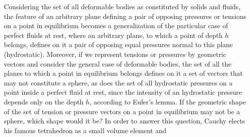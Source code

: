 Considering the set of all deformable bodies as constituted by solids and fluids, the feature of an arbitrary plane defining a pair of opposing pressures or tensions on a point in equilibrium becomes a generalization of the particular case of perfect fluids at rest, where an arbitrary plane, to which a point of depth $h$ belongs, defines on it a pair of opposing equal pressures normal to this plane (hydrostatic). Moreover, if we represent tensions or pressures by geometric vectors and consider the general case of deformable bodies, the set of all the planes to which a point in equilibrium belongs defines on it a set of vectors that may not constitute a sphere, as does the set of all hydrostatic pressures on a point inside a perfect fluid at rest, since the intensity of an hydrostatic pressure depends only on the depth $h$, according to Euler's lemma. If the geometric shape of the set of tension or pressure vectors on a point in equilibrium may not be a sphere, which shape would it be? In order to answer this question, Cauchy elects his famous tetrahedron as a small volume element and             

       



